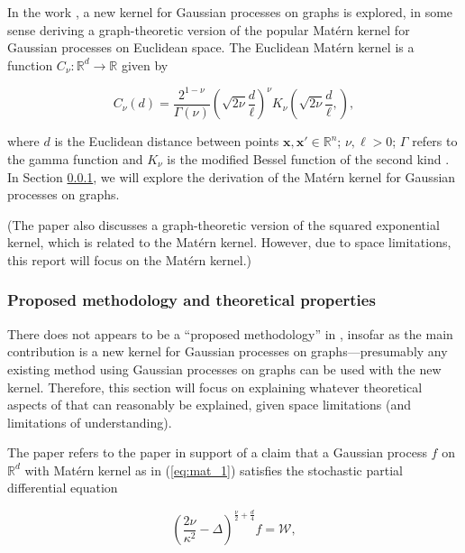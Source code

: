 In the work \cite{pmlr-v130-borovitskiy21a}, a new kernel for Gaussian processes on graphs is explored, in some sense deriving a graph-theoretic version of the popular Mat\'{e}rn kernel for Gaussian processes on Euclidean space. The Euclidean Mat\'{e}rn kernel is a function $C_{\nu} \colon \mathbb R^d \to \mathbb R$ given by

\begin{equation}\label{eq:mat_1}
    C_{\nu}(d) = \frac{2^{1 - \nu}}{\Gamma(\nu)} \left(\sqrt{2 \nu} \frac{d}{\ell}\right)^{\nu} K_{\nu}\left(\sqrt{2 \nu} \frac{d}{\ell},\right),
\end{equation}

where $d$ is the Euclidean distance between points $\bm x, \bm x' \in \mathbb R^n$; $\nu, \ell > 0$; $\Gamma$ refers to the gamma function and $K_{\nu}$ is the modified Bessel function of the second kind \cite{rw}. In Section \ref{sec:method}, we will explore the derivation of the Mat\'{e}rn kernel for Gaussian processes on graphs.

(The paper \cite{pmlr-v130-borovitskiy21a} also discusses a graph-theoretic version of the squared exponential kernel, which is related to the Mat\'{e}rn kernel. However, due to space limitations, this report will focus on the Mat\'{e}rn kernel.)

\subsubsection{Proposed methodology and theoretical properties}\label{sec:method}

There does not appears to be a ``proposed methodology'' in \cite{pmlr-v130-borovitskiy21a}, insofar as the main contribution is a new kernel for Gaussian processes on graphs---presumably any existing method using Gaussian processes on graphs can be used with the new kernel. Therefore, this section will focus on explaining whatever theoretical aspects of \cite{pmlr-v130-borovitskiy21a} that can reasonably be explained, given space limitations (and limitations of understanding).

The paper \cite{pmlr-v130-borovitskiy21a} refers to the paper \cite{whittle1963stochastic} in support of a claim that a Gaussian process $f$ on $\mathbb R^d$ with Mat\'{e}rn kernel as in (\ref{eq:mat_1}) satisfies the stochastic partial differential equation

\begin{equation}\label{eq:spde_mat}
    \left(\frac{2\nu}{\kappa^2} - \Delta\right)^{\frac{\nu}{2} + \frac{d}{4}}f = \mathcal W,
\end{equation}

